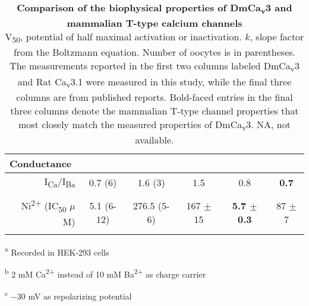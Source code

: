 {\begin{table}[ht!]
\begin{center}
\begin{threeparttable}
\begin{tabular}{@{}rccccc@{}}
\multicolumn{1}{l}{{\bf Conductance}} &  &  &  &  &  \\ \midrule \addlinespace
I\textsubscript{Ca}/I\textsubscript{Ba} & 0.7 (6) & 1.6 (3) & 1.5\cite{shcheglovitov:2007aa} & 0.8\cite{shcheglovitov:2007aa} & {\bf 0.7\cite{shcheglovitov:2007aa}} \\ \addlinespace \addlinespace
\multicolumn{1}{l}{{\bf Pharmacology}} &  &  &  &  &  \\ \midrule \addlinespace
Ni\textsuperscript{2+} (IC\textsubscript{50} $\mu$M) & 5.1 (6-12) & 276.5 (5-6) & 167 $\pm$ 15\cite{lee:1999ab}\tnote{c} & {\bf 5.7 $\pm$ 0.3\cite{lee:1999ab}\tnote{c}} & 87 $\pm$ 7\cite{lee:1999ab}\tnote{c} \\ \addlinespace 
\end{tabular}
    \begin{tablenotes}
        \begin{flushleft}
        \item[\textsuperscript{a}] Recorded in HEK-293 cells
        \item[\textsuperscript{b}] 2 mM Ca\textsuperscript{2+} instead of 10 mM Ba\textsuperscript{2+} as charge carrier
        \item[\textsuperscript{c}] $-$30 mV as repolarizing potential
        \end{flushleft}
    \end{tablenotes}
\end{threeparttable}
\end{center}
\caption{
{\bf Comparison of the biophysical properties of DmCa\textsubscript{v}3 and mammalian T-type calcium channels}
\\
V\textsubscript{50}, potential of half maximal activation or inactivation.
$k$, slope factor from the Boltzmann equation.
Number of oocytes is in parentheses.
The measurements reported in the first two columns labeled DmCa\textsubscript{v}3 and Rat Ca\textsubscript{v}3.1 were measured in this study, while the final three columns are from published reports.
Bold-faced entries in the final three columns denote the mammalian T-type channel properties that most closely match the measured properties of DmCa\textsubscript{v}3.
NA, not available.}
\label{tab:1}
\end{table}
}